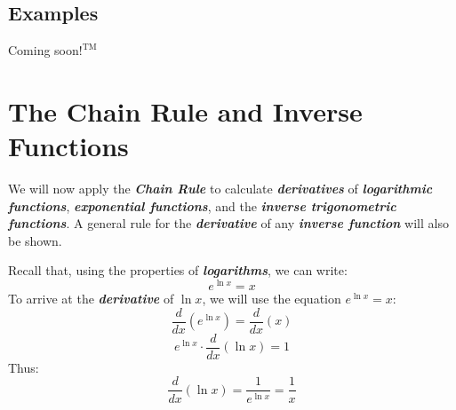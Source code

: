 \begin{center}
\section*{\small Examples}
Coming soon$!^{\text{TM}}$
\end{center}

\section{The Chain Rule and Inverse Functions}
We will now apply the \textbf{\textit{Chain Rule}} to calculate \textbf{\textit{derivatives}} of \textbf{\textit{logarithmic functions}}, \textbf{\textit{exponential functions}}, and the \textbf{\textit{inverse trigonometric functions}}. A general rule for the \textbf{\textit{derivative}} of any \textbf{\textit{inverse function}} will also be shown.

\vspace{0.1in}
Recall that, using the properties of \textbf{\textit{logarithms}}, we can write:
%
\begin{equation}
e^{\ln x} = x
\end{equation}
%
To arrive at the \textbf{\textit{derivative}} of $\ln x$, we will use the equation $e^{\ln x} = x$:
%
\begin{equation}
\frac{d}{dx}\left(e^{\ln x}\right) = \frac{d}{dx}\left(x\right)
\end{equation}
%
\begin{equation}
e^{\ln x} \cdot \frac{d}{dx}\left(\ln x\right) = 1
\end{equation}
%
Thus:
%
\begin{equation}
\frac{d}{dx} \left(\ln x \right) = \frac{1}{e^{\ln x}} = \frac{1}{x}
\end{equation}
%

